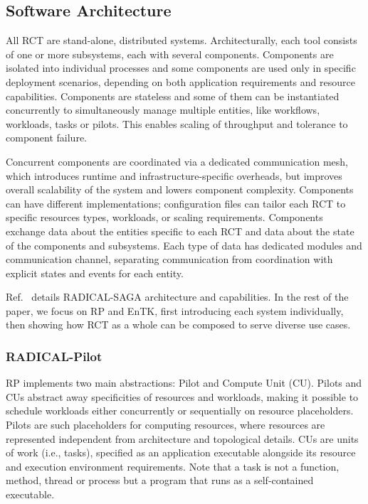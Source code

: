 \documentclass[preprint,12pt, a4paper]{elsarticle}
\begin{document}
\subsection{Software Architecture}\label{ssec:architecture}


All RCT are stand-alone, distributed systems. Architecturally, each tool
consists of one or more subsystems, each with several components. Components
are isolated into individual processes and some components are used only in
specific deployment scenarios, depending on both application requirements and
resource capabilities. Components are stateless and some of them can be
instantiated concurrently to simultaneously manage multiple entities, like
workflows, workloads, tasks or pilots. This enables scaling of throughput and
tolerance to component failure.

Concurrent components are coordinated via a dedicated communication mesh,
which introduces runtime and infrastructure-specific overheads, but improves
overall scalability of the system and lowers component complexity. Components
can have different implementations; configuration files can tailor each RCT
to specific resources types, workloads, or scaling requirements. Components
exchange data about the entities specific to each RCT and data about the
state of the components and subsystems. Each type of data has dedicated
modules and communication channel, separating communication from coordination
with explicit states and events for each entity.

Ref.~\cite{merzky2015saga} details RADICAL-SAGA architecture and
capabilities. In the rest of the paper, we focus on RP and EnTK, first
introducing each system individually, then showing how RCT as a whole can be
composed to serve diverse use cases.

\subsubsection{RADICAL-Pilot}\label{sssec:arch_rp}

RP implements two main abstractions: Pilot and Compute Unit (CU). Pilots and
CUs abstract away specificities of resources and workloads, making it
possible to schedule workloads either concurrently or sequentially on
resource placeholders. Pilots are such placeholders for computing resources,
where resources are represented independent from architecture and topological
details. CUs are units of work (i.e., tasks), specified as an application
executable alongside its resource and execution environment requirements.
Note that a task is not a function, method, thread or process but a program
that runs as a self-contained executable.
\end{document}
